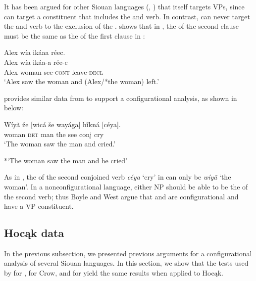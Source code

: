 \documentclass[output=paper]{LSP/langsci}
\begin{document}
It has been argued for other Siouan languages (\citealt{Boyle2007}, \citealt{West2003}) that  itself targets VPs, since  can target a constituent that includes the  and verb. In contrast,  can never target the  and verb to the exclusion of the .  \citet{Boyle2007} shows that in , the  of the second clause must be the same as the  of the first clause in :

\begin{exe}
\ex\label{ex:jrs:29} 
\glll Alex w\'ia ik\'aaa r\'eec.\\
Alex w\'ia ik\'aa-a r\'ee-c \\
Alex woman see-\textsc{cont} leave-\textsc{decl} \\
\trans `Alex saw the woman and (Alex/*the woman) left.' \citep[217]{Boyle2007} 
\end{exe}

\citet{West2003} provides similar data from  to support a configurational analysis, as shown in  below:

\begin{exe}
\ex\label{ex:jrs:30} \gll W\'iy\~a 	 \v{z}e 		[wic\'a 	\v{s}e 	way\'aga] h\~ikn\'a 	[c\'eya]. \\
woman 	\textsc{det} 	man 		the see 				conj 		cry \\
\trans `The woman saw the man and cried.'

*`The woman saw the man and he cried' \citep[34]{West2003}
\end{exe}

As in , the  of the second conjoined verb \textit{c\'eya} `cry' in  can only be \textit{w\'iy\~a} `the woman'.  In a nonconfigurational language, either NP should be able to be the  of the second verb; thus Boyle and West argue that  and  are configurational and have a VP constituent.

 
\subsection{Hocąk data}

In the previous subsection, we presented previous arguments for a configurational analysis of several Siouan languages.  In this section, we show that the tests used by \citet{Boyle2007} for , \citet{Graczyk1991a} for Crow, and \citet{West2003} for  yield the same results when applied to Hocąk.
	
\end{document}
